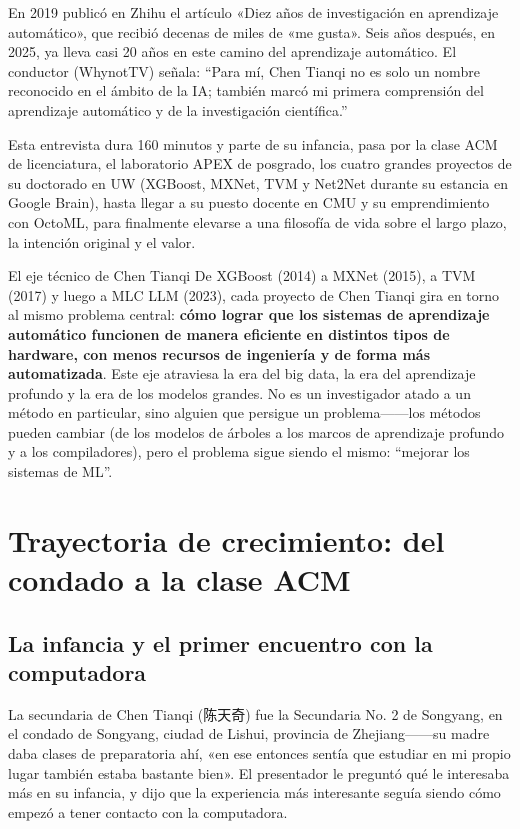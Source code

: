 \documentclass[a4paper]{article}
\begin{document}
En 2019 publicó en Zhihu el artículo «Diez años de investigación en aprendizaje automático», que recibió decenas de miles de «me gusta». Seis años después, en 2025, ya lleva casi 20 años en este camino del aprendizaje automático. El conductor (WhynotTV) señala: ``Para mí, Chen Tianqi no es solo un nombre reconocido en el ámbito de la IA; también marcó mi primera comprensión del aprendizaje automático y de la investigación científica.''

Esta entrevista dura 160 minutos y parte de su infancia, pasa por la clase ACM de licenciatura, el laboratorio APEX de posgrado, los cuatro grandes proyectos de su doctorado en UW (XGBoost, MXNet, TVM y Net2Net durante su estancia en Google Brain), hasta llegar a su puesto docente en CMU y su emprendimiento con OctoML, para finalmente elevarse a una filosofía de vida sobre el largo plazo, la intención original y el valor.

\begin{importantbox}{El eje técnico de Chen Tianqi}
De XGBoost (2014) a MXNet (2015), a TVM (2017) y luego a MLC LLM (2023), cada proyecto de Chen Tianqi gira en torno al mismo problema central: \textbf{cómo lograr que los sistemas de aprendizaje automático funcionen de manera eficiente en distintos tipos de hardware, con menos recursos de ingeniería y de forma más automatizada}. Este eje atraviesa la era del big data, la era del aprendizaje profundo y la era de los modelos grandes. No es un investigador atado a un método en particular, sino alguien que persigue un problema------los métodos pueden cambiar (de los modelos de árboles a los marcos de aprendizaje profundo y a los compiladores), pero el problema sigue siendo el mismo: ``mejorar los sistemas de ML''.
\end{importantbox}

\section{Trayectoria de crecimiento: del condado a la clase ACM}

\subsection{La infancia y el primer encuentro con la computadora}

La secundaria de Chen Tianqi (陈天奇) fue la Secundaria No. 2 de Songyang, en el condado de Songyang, ciudad de Lishui, provincia de Zhejiang------su madre daba clases de preparatoria ahí, «en ese entonces sentía que estudiar en mi propio lugar también estaba bastante bien». El presentador le preguntó qué le interesaba más en su infancia, y dijo que la experiencia más interesante seguía siendo cómo empezó a tener contacto con la computadora.
\end{document}
